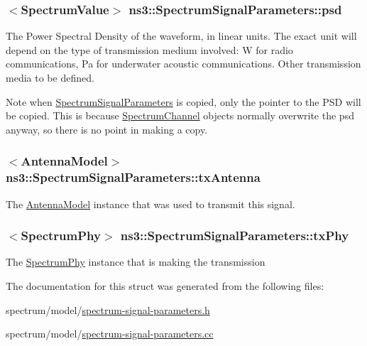 \subsubsection[{\texorpdfstring{psd}{psd}}]{$<${\bf Spectrum\+Value}$>$ ns3\+::\+Spectrum\+Signal\+Parameters\+::psd}\hypertarget{structns3_1_1SpectrumSignalParameters_afc3b87e914306b069232fda861836051}{}\label{structns3_1_1SpectrumSignalParameters_afc3b87e914306b069232fda861836051}
The Power Spectral Density of the waveform, in linear units. The exact unit will depend on the type of transmission medium involved\+: W for radio communications, Pa for underwater acoustic communications. Other transmission media to be defined.

\begin{DoxyNote}{Note}
when \hyperlink{structns3_1_1SpectrumSignalParameters}{Spectrum\+Signal\+Parameters} is copied, only the pointer to the P\+SD will be copied. This is because \hyperlink{classns3_1_1SpectrumChannel}{Spectrum\+Channel} objects normally overwrite the psd anyway, so there is no point in making a copy. 
\end{DoxyNote}
\subsubsection[{\texorpdfstring{tx\+Antenna}{txAntenna}}]{$<${\bf Antenna\+Model}$>$ ns3\+::\+Spectrum\+Signal\+Parameters\+::tx\+Antenna}\hypertarget{structns3_1_1SpectrumSignalParameters_a1357e30abf1daa897e134d28a900232a}{}\label{structns3_1_1SpectrumSignalParameters_a1357e30abf1daa897e134d28a900232a}
The \hyperlink{classns3_1_1AntennaModel}{Antenna\+Model} instance that was used to transmit this signal. 
\subsubsection[{\texorpdfstring{tx\+Phy}{txPhy}}]{$<${\bf Spectrum\+Phy}$>$ ns3\+::\+Spectrum\+Signal\+Parameters\+::tx\+Phy}\hypertarget{structns3_1_1SpectrumSignalParameters_ab20434042353cbd479e1f9d807f9e37d}{}\label{structns3_1_1SpectrumSignalParameters_ab20434042353cbd479e1f9d807f9e37d}
The \hyperlink{classns3_1_1SpectrumPhy}{Spectrum\+Phy} instance that is making the transmission 

The documentation for this struct was generated from the following files\+:\begin{DoxyCompactItemize}
\item 
spectrum/model/\hyperlink{spectrum-signal-parameters_8h}{spectrum-\/signal-\/parameters.\+h}\item 
spectrum/model/\hyperlink{spectrum-signal-parameters_8cc}{spectrum-\/signal-\/parameters.\+cc}\end{DoxyCompactItemize}
